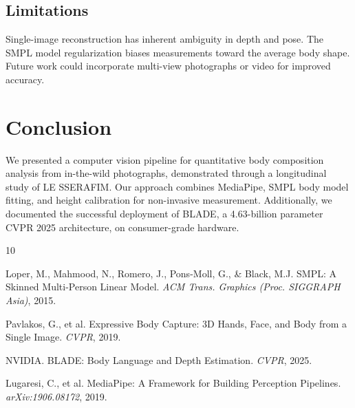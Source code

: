 \documentclass[11pt,a4paper]{article}
\begin{document}
\subsection{Limitations}
Single-image reconstruction has inherent ambiguity in depth and pose. The SMPL model regularization biases measurements toward the average body shape. Future work could incorporate multi-view photographs or video for improved accuracy.




\section{Conclusion}
We presented a computer vision pipeline for quantitative body composition analysis from in-the-wild photographs, demonstrated through a longitudinal study of LE SSERAFIM. Our approach combines MediaPipe, SMPL body model fitting, and height calibration for non-invasive measurement. Additionally, we documented the successful deployment of BLADE, a 4.63-billion parameter CVPR 2025 architecture, on consumer-grade hardware.


\begin{thebibliography}{10}

Loper, M., Mahmood, N., Romero, J., Pons-Moll, G., \& Black, M.J.
SMPL: A Skinned Multi-Person Linear Model.
\textit{ACM Trans. Graphics (Proc. SIGGRAPH Asia)}, 2015.

Pavlakos, G., et al.
Expressive Body Capture: 3D Hands, Face, and Body from a Single Image.
\textit{CVPR}, 2019.

NVIDIA.
BLADE: Body Language and Depth Estimation.
\textit{CVPR}, 2025.

Lugaresi, C., et al.
MediaPipe: A Framework for Building Perception Pipelines.
\textit{arXiv:1906.08172}, 2019.

\end{thebibliography}
\end{document}
